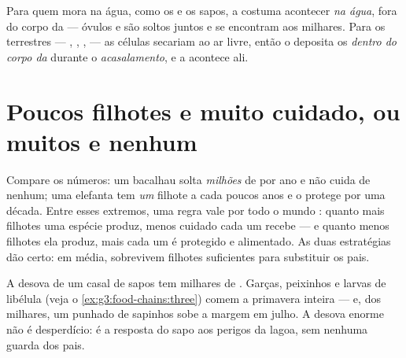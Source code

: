 \begin{proposition}\label{prop:g4:animal-reproduction:where}
Para quem mora na água, como os  e os sapos, a 
costuma acontecer \emph{na água}, fora do corpo da  --- óvulos
e  são soltos juntos e se encontram aos milhares.
Para os  terrestres --- , , ,  ---
as células secariam ao ar livre, então o  deposita os
 \emph{dentro do corpo da } durante o
\emph{acasalamento}, e a  acontece ali.
\end{proposition}
\admitted

\section{Poucos filhotes e muito cuidado, ou muitos e nenhum}

\begin{proposition}\label{prop:g4:animal-reproduction:strategies}
Compare os números: um bacalhau solta \emph{milhões} de  por ano
e não cuida de nenhum; uma elefanta tem \emph{um} filhote a cada
poucos anos e o protege por uma década. Entre esses extremos, uma
regra vale por todo o mundo : quanto mais filhotes uma espécie
produz, menos cuidado cada um recebe --- e quanto menos filhotes ela
produz, mais cada um é protegido e alimentado. As duas estratégias
dão certo: em média, sobrevivem filhotes suficientes para substituir
os pais.
\end{proposition}
\admitted

\begin{example}\label{ex:g4:animal-reproduction:pondcount}
A desova de um casal de sapos tem milhares de . Garças,
peixinhos e larvas de libélula (veja o
\cref{ex:g3:food-chains:three}) comem  a primavera inteira
--- e, dos milhares, um punhado de sapinhos sobe a margem em julho.
A desova enorme não é desperdício: é a resposta do sapo aos perigos
da lagoa, sem nenhuma guarda dos pais.
\end{example}

